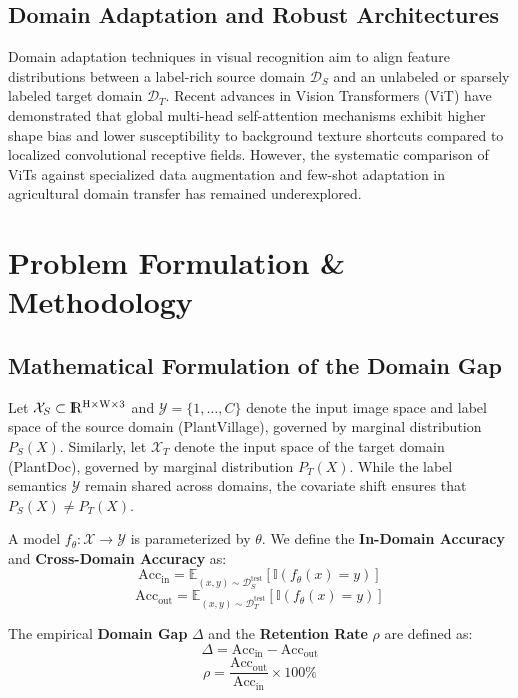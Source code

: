 \documentclass[twoside,a4paper,11pt]{article}
\newcommand{\Runo}{\rm I\hspace{-0.55ex}R}
\begin{document}
\subsection{Domain Adaptation and Robust Architectures}
Domain adaptation techniques in visual recognition aim to align feature distributions between a label-rich source domain $\mathcal{D}_S$ and an unlabeled or sparsely labeled target domain $\mathcal{D}_T$. Recent advances in Vision Transformers (ViT) \cite{Dosovitskiy:20} have demonstrated that global multi-head self-attention mechanisms exhibit higher shape bias and lower susceptibility to background texture shortcuts compared to localized convolutional receptive fields. However, the systematic comparison of ViTs against specialized data augmentation and few-shot adaptation in agricultural domain transfer has remained underexplored.

\section{Problem Formulation \& Methodology}

\subsection{Mathematical Formulation of the Domain Gap}
Let $\mathcal{X}_S \subset \Runo^{H \times W \times 3}$ and $\mathcal{Y} = \{1, \dots, C\}$ denote the input image space and label space of the source domain (PlantVillage), governed by marginal distribution $P_S(X)$. Similarly, let $\mathcal{X}_T$ denote the input space of the target domain (PlantDoc), governed by marginal distribution $P_T(X)$. While the label semantics $\mathcal{Y}$ remain shared across domains, the covariate shift ensures that $P_S(X) \neq P_T(X)$.

A model $f_\theta: \mathcal{X} \rightarrow \mathcal{Y}$ is parameterized by $\theta$. We define the \textbf{In-Domain Accuracy} and \textbf{Cross-Domain Accuracy} as:
\begin{equation}
\text{Acc}_{\text{in}} = \mathbb{E}_{(x, y) \sim \mathcal{D}_S^{\text{test}}} \left[ \mathbb{I}(f_\theta(x) = y) \right]
\end{equation}
\begin{equation}
\text{Acc}_{\text{out}} = \mathbb{E}_{(x, y) \sim \mathcal{D}_T^{\text{test}}} \left[ \mathbb{I}(f_\theta(x) = y) \right]
\end{equation}

The empirical \textbf{Domain Gap} $\Delta$ and the \textbf{Retention Rate} $\rho$ are defined as:
\begin{equation}
\Delta = \text{Acc}_{\text{in}} - \text{Acc}_{\text{out}}
\end{equation}
\begin{equation}
\rho = \frac{\text{Acc}_{\text{out}}}{\text{Acc}_{\text{in}}} \times 100\%
\end{equation}
\end{document}
